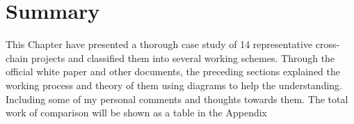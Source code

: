 













\section{Summary}
\noindent This Chapter have presented a thorough case study of 14 representative cross-chain projects and classified them into several working schemes. Through the official white paper and other documents, the preceding sections explained the working process and theory of them using diagrams to help the understanding. Including some of my personal comments and thoughts towards them. The total work of comparison will be shown as a table in the Appendix%
